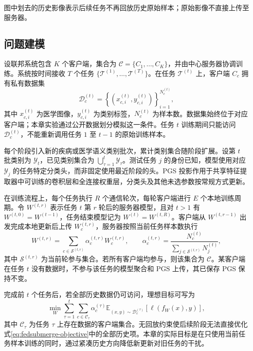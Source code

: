 图中划去的历史影像表示后续任务不再回放历史原始样本；原始影像不直接上传至服务器。

\subsection{问题建模}
\label{sec:fedsubmerge-formulation}

设联邦系统包含 $K$ 个客户端，集合为
$\mathcal{C}=\{C_1,\ldots,C_K\}$，并由中心服务器协调训练。系统按时间接收 $T$ 个任务
$\{\mathcal{T}^{(1)},\ldots,\mathcal{T}^{(T)}\}$。在任务 $\mathcal{T}^{(t)}$ 上，客户端 $C_c$ 拥有私有数据集
\begin{equation}
\mathcal{D}^{(t)}_c
=
\left\{\left(x^{(t)}_{c,i},y^{(t)}_{c,i}\right)\right\}_{i=1}^{N^{(t)}_c},
\label{eq:fedsubmerge-local-dataset}
\end{equation}
其中 $x^{(t)}_{c,i}$ 为医学图像，$y^{(t)}_{c,i}$ 为类别标签，$N^{(t)}_c$ 为样本数。数据集始终位于对应客户端；本章实验通过公开数据划分模拟这一条件。任务 $t$ 训练期间只能访问 $\mathcal{D}^{(t)}_c$，不能重新调用任务 $1$ 至 $t-1$ 的原始训练样本。

每个阶段引入新的疾病或医学语义类别批次，累计类别集合随阶段扩展。设第 $t$ 批类别为 $\mathcal{Y}_t$，已见类别集合为 $\bigcup_{\tau=1}^{t}\mathcal{Y}_{\tau}$。测试任务 $j$ 的身份已知，模型使用对应 $\mathcal{Y}_j$ 的任务特定分类头，而非固定使用最近阶段的头。PGS 投影作用于共享特征提取器中可训练的卷积层和全连接权重层，分类头及其他未选参数按常规方式更新。

在训练流程上，每个任务执行 $R$ 个通信轮次，每轮客户端进行 $E$ 个本地训练周期。令 $W^{(t,r)}$ 表示任务 $t$ 第 $r$ 轮后的服务器模型，且对 $t>1$ 有 $W^{(t,0)}=W^{(t-1)}$，任务结束模型记为 $W^{(t)}=W^{(t,R)}$。客户端从 $W^{(t,r-1)}$ 出发完成本地更新后上传 $W_c^{(t,r)}$，服务器按照当前任务样本数执行
\begin{equation}
W^{(t,r)}
=
\sum_{c\in\mathcal{S}^{(t,r)}}
\alpha_c^{(t,r)}W_c^{(t,r)},
\qquad
\alpha_c^{(t,r)}
=
\frac{N_c^{(t)}}{\sum_{j\in\mathcal{S}^{(t,r)}}N_j^{(t)}},
\label{eq:fedsubmerge-fedavg}
\end{equation}
其中 $\mathcal{S}^{(t,r)}$ 为当前轮参与集合。若所有客户端均参与，则该集合为 $\mathcal{C}$。某客户端在任务 $t$ 没有数据时，不参与该任务的模型聚合和 PGS 上传，其已保存 PGS 保持不变。

完成前 $t$ 个任务后，若全部历史数据仍可访问，理想目标可写为
\begin{equation}
\min_W
\sum_{\tau=1}^{t}
\sum_{c\in\mathcal{C}_{\tau}}
\alpha_c^{(\tau)}
\mathbb{E}_{(x,y)\sim\mathcal{D}^{(\tau)}_c}
\left[\ell\!\left(f_W(x),y\right)\right],
\label{eq:fedsubmerge-objective}
\end{equation}
其中 $\mathcal{C}_{\tau}$ 为任务 $\tau$ 上存在数据的客户端集合。无回放约束使后续阶段无法直接优化式\eqref{eq:fedsubmerge-objective}中的全部历史项。本章的实际目标是在只使用当前任务样本训练的同时，通过紧凑历史方向降低新更新对旧任务的干扰。

